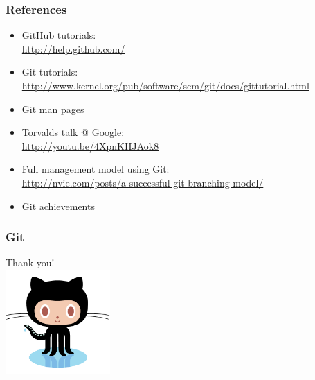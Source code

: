 \documentclass[]{beamer}
\begin{document}
\begin{frame}
  \frametitle{References}
  \begin{itemize}
    \item GitHub tutorials: \\
      \url{http://help.github.com/}
    \item Git tutorials: \\
      \url{http://www.kernel.org/pub/software/scm/git/docs/gittutorial.html}
    \item Git man pages
    \item Torvalds talk @ Google: \\
      \url{http://youtu.be/4XpnKHJAok8}
    \item Full management model using Git: \\
      \url{http://nvie.com/posts/a-successful-git-branching-model/}
    \item Git achievements
  \end{itemize}
\end{frame}

\begin{frame}
  \frametitle{Git}
    \begin{center}
      Thank you! \\
      \includegraphics[height=4cm]{Octocat.png}
    \end{center}
\end{frame}
\end{document}
